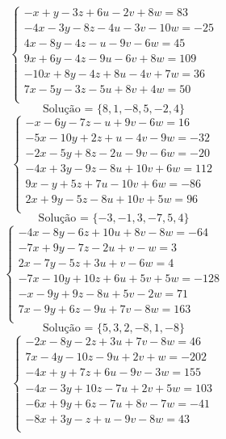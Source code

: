 \documentclass[12pt,oneside,a4paper]{article}
\begin{document}
\vspace{\baselineskip}
\begin{equation*}
\begin{cases}
-x+y-3z+6u-2v+8w=83 \\
-4x-3y-8z-4u-3v-10w=-25 \\
4x-8y-4z-u-9v-6w=45 \\
9x+6y-4z-9u-6v+8w=109 \\
-10x+8y-4z+8u-4v+7w=36 \\
7x-5y-3z-5u+8v+4w=50 \\
\end{cases}
\end{equation*}
\begin{equation*}
\text{Solução = }\{8,1,-8,5,-2,4\}
\end{equation*}
\vspace{\baselineskip}
\begin{equation*}
\begin{cases}
-x-6y-7z-u+9v-6w=16 \\
-5x-10y+2z+u-4v-9w=-32 \\
-2x-5y+8z-2u-9v-6w=-20 \\
-4x+3y-9z-8u+10v+6w=112 \\
9x-y+5z+7u-10v+6w=-86 \\
2x+9y-5z-8u+10v+5w=96 \\
\end{cases}
\end{equation*}
\begin{equation*}
\text{Solução = }\{-3,-1,3,-7,5,4\}
\end{equation*}
\vspace{\baselineskip}
\begin{equation*}
\begin{cases}
-4x-8y-6z+10u+8v-8w=-64 \\
-7x+9y-7z-2u+v-w=3 \\
2x-7y-5z+3u+v-6w=4 \\
-7x-10y+10z+6u+5v+5w=-128 \\
-x-9y+9z-8u+5v-2w=71 \\
7x-9y+6z-9u+7v-8w=163 \\
\end{cases}
\end{equation*}
\begin{equation*}
\text{Solução = }\{5,3,2,-8,1,-8\}
\end{equation*}
\vspace{\baselineskip}
\begin{equation*}
\begin{cases}
-2x-8y-2z+3u+7v-8w=46 \\
7x-4y-10z-9u+2v+w=-202 \\
-4x+y+7z+6u-9v-3w=155 \\
-4x-3y+10z-7u+2v+5w=103 \\
-6x+9y+6z-7u+8v-7w=-41 \\
-8x+3y-z+u-9v-8w=43 \\
\end{cases}
\end{equation*}
\end{document}
